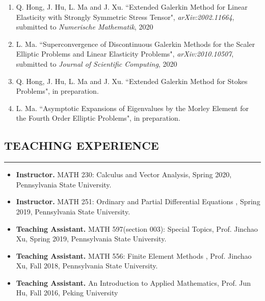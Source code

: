 \documentclass[10pt,a4]{article}
\begin{document}
\begin{small}
\begin{enumerate}
	\item Q. Hong, J. Hu, L. Ma and J. Xu. ``Extended Galerkin Method for Linear Elasticity with Strongly Symmetric Stress Tensor", {\it arXiv:2002.11664}, submitted to   {\it Numerische Mathematik}, 2020
	
	\item L. Ma. ``Superconvergence of Discontinuous Galerkin Methods for the Scaler Elliptic Problems and Linear Elasticity Problems", {\it arXiv:2010.10507}, submitted to  {\it Journal of Scientific Computing}, 2020
	
	\item Q. Hong, J. Hu, L. Ma and J. Xu. ``Extended Galerkin Method for Stokes Problems", in preparation.
	
	\item L. Ma. ``Asymptotic Expansions of Eigenvalues by the Morley Element for the Fourth Order Elliptic Problems", in preparation.
	 
    
\end{enumerate}

\subsection*{TEACHING EXPERIENCE}
\hrule
\vspace{0.2cm}

\begin{itemize}

\item {\bf Instructor.} MATH 230:  Calculus and Vector Analysis, Spring 2020, Pennsylvania State University. 

\item {\bf Instructor.} MATH 251: Ordinary and Partial Differential Equations , Spring 2019, Pennsylvania State University.

\item {\bf Teaching Assistant.} MATH 597(section 003): Special Topics, Prof. Jinchao Xu, Spring 2019, Pennsylvania State University.

\item {\bf Teaching Assistant.} MATH 556: Finite Element Methods , Prof. Jinchao Xu, Fall 2018, Pennsylvania State University.

\item {\bf Teaching Assistant.} An Introduction to Applied Mathematics,  Prof. Jun Hu, Fall 2016, Peking University  
\end{itemize}

\end{small}
\end{document}
